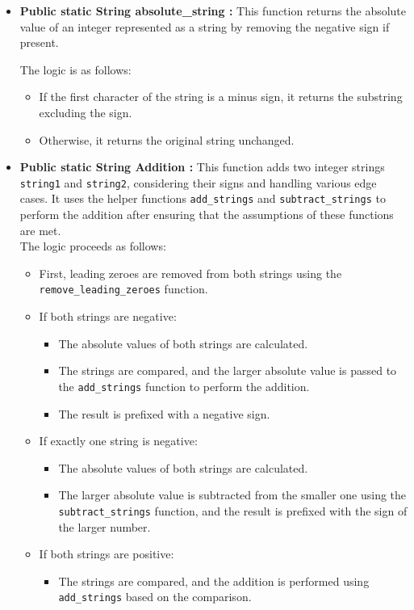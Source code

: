 \documentclass{article}
\begin{document}
\begin{itemize}
\item \textbf{Public static String absolute\_string :} This function returns the absolute value of an integer represented as a string by removing the negative sign if present.

The logic is as follows:
\begin{itemize}
    \item If the first character of the string is a minus sign, it returns the substring excluding the sign.
    \item Otherwise, it returns the original string unchanged.
\end{itemize}

\item \textbf{Public static String Addition :} This function adds two integer strings \texttt{string1} and \texttt{string2}, considering their signs and handling various edge cases. It uses the helper functions \texttt{add\_strings} and \texttt{subtract\_strings} to perform the addition after ensuring that the assumptions of these functions are met.\\

The logic proceeds as follows:
\begin{itemize}
    \item First, leading zeroes are removed from both strings using the \texttt{remove\_leading\_zeroes} function.
    \item If both strings are negative:
    \begin{itemize}
        \item The absolute values of both strings are calculated.
        \item The strings are compared, and the larger absolute value is passed to the \texttt{add\_strings} function to perform the addition.
        \item The result is prefixed with a negative sign.
    \end{itemize}
    \item If exactly one string is negative:
    \begin{itemize}
        \item The absolute values of both strings are calculated.
        \item The larger absolute value is subtracted from the smaller one using the \texttt{subtract\_strings} function, and the result is prefixed with the sign of the larger number.
    \end{itemize}
    \item If both strings are positive:
    \begin{itemize}
        \item The strings are compared, and the addition is performed using \texttt{add\_strings} based on the comparison.
    \end{itemize}
\end{itemize}\\


\end{itemize}
\end{document}

